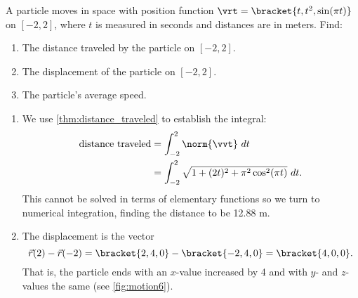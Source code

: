 \begin{example}\label{ex_motion6}
A particle moves in space with position function $\vrt =\bracket{t,t^2,\sin (\pi t)}$ on $[-2,2]$, where $t$ is measured in seconds and distances are in meters. Find:
\begin{enumerate}
	\item The distance traveled by the particle on $[-2,2]$.
	\item	The displacement of the particle on $[-2,2]$.
	\item	The particle's average speed.
\end{enumerate}
\solution
\begin{enumerate}
	\item We use \autoref{thm:distance_traveled} to establish the integral:
	{%
	}%
	\begin{align*}
	\text{distance traveled}
	&= \int_{-2}^2 \norm{\vvt}\ dt \\
	&= \int_{-2}^2 \sqrt{1+(2t)^2+ \pi^2\cos^2(\pi t)}\ dt.
	\end{align*}
	This cannot be solved in terms of elementary functions so we turn to numerical integration, finding the distance to be 12.88 m.
	
	\item	The displacement is the vector
	\[\vec r(2)-\vec r(-2) =\bracket{2,4,0}-\bracket{-2,4,0}=\bracket{4,0,0}.\]
	That is, the particle ends with an $x$-value increased by 4 and with $y$- and $z$-values the same (see \autoref{fig:motion6}).
	

\end{enumerate}
\end{example}
